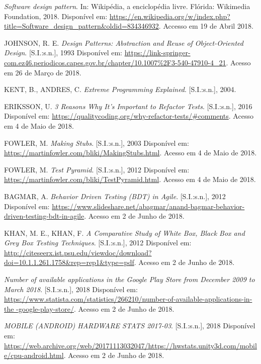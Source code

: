 \documentclass[
    12pt,       %
    openright,      %
    twoside,      %
    a4paper,      %
    english,      %
    french,       %
    spanish,      %
    brazil,       %
    ]{abntex2}
\begin{document}
  \noindent
  \textit{Software design pattern}. In: Wikipédia, a enciclopédia livre. Flórida: Wikimedia Foundation,
  2018. Disponível em:
  \url{https://en.wikipedia.org/w/index.php?title=Software_design_pattern&oldid=834346932}. Accesso
  em 19 de Abril 2018.

  \noindent
  JOHNSON, R. E. \textit{Design Patterns: Abstraction and Reuse of Object-Oriented Design}. [S.I.:s.n.], 1993 Disponível em: \url{https://link-springer-com.ez46.periodicos.capes.gov.br/chapter/10.1007%2F3-540-47910-4_21}. Acesso em 26 de Março de 2018.

  \noindent
  KENT, B., ANDRES, C. \textit{Extreme Programming Explained}. [S.I.:s.n.], 2004.

  \noindent
  ERIKSSON, U. \textit{3 Reasons Why It's Important to Refactor Tests}. [S.I.:s.n.], 2016 Disponível em:
  \url{https://qualitycoding.org/why-refactor-tests/#comments}. Acesso em 4 de Maio de 2018.

  \noindent
  FOWLER, M. \textit{Making Stubs}. [S.I.:s.n.], 2003 Disponível em:
  \url{https://martinfowler.com/bliki/MakingStubs.html}. Acesso em 4 de Maio de 2018.

  \noindent
  FOWLER, M. \textit{Test Pyramid}. [S.I.:s.n.], 2012 Disponível em:
  \url{https://martinfowler.com/bliki/TestPyramid.html}. Acesso em 4 de Maio de 2018.

  \noindent
  BAGMAR, A. \textit{Behavior Driven Testing (BDT) in Agile}. [S.I.:s.n.], 2012 Disponível em:
  \url{https://www.slideshare.net/abagmar/anand-bagmar-behavior-driven-testing-bdt-in-agile}. Acesso em 2 de Junho de 2018.

  \noindent
  KHAN, M. E., KHAN, F. \textit{A Comparative Study of White Box, Black Box and Grey Box Testing Techniques}. [S.I.:s.n.], 2012 Disponível em: \url{http://citeseerx.ist.psu.edu/viewdoc/download?doi=10.1.1.261.1758&rep=rep1&type=pdf}. Acesso em 2 de Junho de 2018.

  \noindent
  \textit{Number of available applications in the Google Play Store from December 2009 to March 2018}.
  [S.I.:s.n.], 2018 Disponível em: \url{https://www.statista.com/statistics/266210/number-of-available-applications-in-the -google-play-store/}. Acesso em 2 de Junho de 2018.

  \noindent
  \textit{MOBILE (ANDROID) HARDWARE STATS 2017-03}. [S.I.:s.n.], 2018 Disponível em: \url{https://web.archive.org/web/20171113032047/https://hwstats.unity3d.com/mobile/cpu-android.html}. Acesso em 2 de Junho de 2018.
\end{document}
